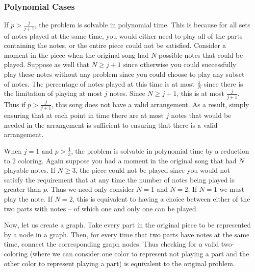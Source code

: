 \documentclass[11pt,letterpaper]{article}
\begin{document}


\subsubsection{Polynomial Cases}

If $p > \frac{j}{j+1}$, the problem is solvable in polynomial time. This is because for all sets of notes played at the same time, you would either need to play all of the parts containing the notes, or the entire piece could not be satisfied. Consider a moment in the piece when the original song had $N$ possible notes that could be played. Suppose as well that $N \ge j+1$ since otherwise you could successfully play these notes without any problem since you could choose to play any subset of notes. The percentage of notes played at this time is at most $\frac{j}{N}$ since there is the limitation of playing at most $j$ notes. Since $N\ge j+1$, this is at most $\frac{j}{j+1}$. Thus if $p > \frac{j}{j+1}$, this song does not have a valid arrangement. As a result, simply ensuring that at each point in time there are at most $j$ notes that would be needed in the arrangement is sufficient to ensuring that there is a valid arrangement.

When $j=1$ and $ p >\frac{1}{3}$, the problem is solvable in polynomial time by a reduction to 2 coloring. Again suppose you had a moment in the original song that had $N$ playable notes. If $N\ge3$, the piece could not be played since you would not satisfy the requirement that at any time the number of notes being played is greater than $p$. Thus we need only consider $N=1$ and $N=2$. If $N=1$ we must play the note. If $N=2$, this is equivalent to having a choice between either of the two parts with notes -- of which one and only one can be played.

Now, let us create a graph. Take every part in the original piece to be represented by a node in a graph. Then, for every time that two parts have notes at the same time, connect the corresponding graph nodes. Thus checking for a valid two-coloring (where we can consider one color to represent not playing a part and the other color to represent playing a part) is equivalent to the original problem.
\end{document}
